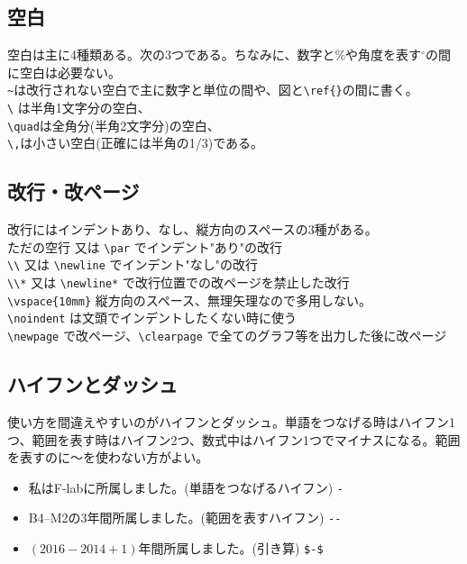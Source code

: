 \documentclass[a4j]{jsarticle}
\begin{document}
\subsection{空白}
空白は主に4種類ある。次の3つである。ちなみに、数字と\%や角度を表す$^\circ$の間に空白は必要ない。\\
\verb|~|は改行されない空白で主に数字と単位の間や、図と\verb|\ref{}|の間に書く。\\
\verb|\| は半角1文字分の空白、\\
\verb|\quad|は全角分(半角2文字分)の空白、\\
\verb|\,|は小さい空白(正確には半角の1/3)である。
\subsection{改行・改ページ}
改行にはインデントあり、なし、縦方向のスペースの3種がある。\\
ただの空行 又は \verb|\par| でインデント"あり"の改行\\
\verb|\\| 又は \verb|\newline| でインデント"なし"の改行\\
\verb|\\*| 又は \verb|\newline*| で改行位置での改ページを禁止した改行\\
\verb|\vspace{10mm}|	縦方向のスペース、無理矢理なので多用しない。\\
\verb|\noindent| は文頭でインデントしたくない時に使う\\
\verb|\newpage| で改ページ、\verb|\clearpage| で全てのグラフ等を出力した後に改ページ
\subsection{ハイフンとダッシュ}
使い方を間違えやすいのがハイフンとダッシュ。単語をつなげる時はハイフン1つ、範囲を表す時はハイフン2つ、数式中はハイフン1つでマイナスになる。範囲を表すのに～を使わない方がよい。

\begin{itemize}
 \item 私はF-labに所属しました。(単語をつなげるハイフン) \verb|-|
 \item B4--M2の3年間所属しました。(範囲を表すハイフン) \verb|--|
 \item $(2016-2014+1)$年間所属しました。(引き算) \verb|$-$|
\end{itemize}
\clearpage
\end{document}
